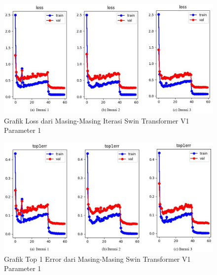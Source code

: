 
\begin{figure}[ht]
  \centering
  \includegraphics[scale=0.55]{gambar/Train SwinV1 Loss.png}
  \caption{Grafik Loss dari Masing-Masing Iterasi Swin Transformer V1 Parameter 1}
  \label{fig:grafiklossdantop1errdariswinv1parameter1iterasi1}
\end{figure}

\begin{figure}[ht]
  \centering
  \includegraphics[scale=0.55]{gambar/Train SwinV1 Top1Err.png}
  \caption{Grafik Top 1 Error dari Masing-Masing Swin Transformer V1 Parameter 1}
  \label{fig:grafiklossdantop1errdariswinv1parameter1iterasi2}
\end{figure}


